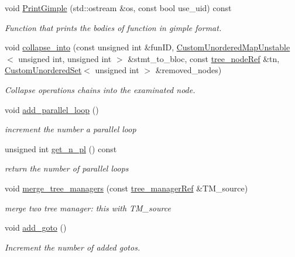 \begin{DoxyCompactItemize}
void \hyperlink{classtree__manager_a580b0289adae5c5d180ceae72ea854fc}{Print\+Gimple} (std\+::ostream \&os, const bool use\+\_\+uid) const
\begin{DoxyCompactList}\small\item\em Function that prints the bodies of function in gimple format. \end{DoxyCompactList}\item 
void \hyperlink{classtree__manager_ac728a1e9ad1c48fe09936df555cb9980}{collapse\+\_\+into} (const unsigned int \&fun\+ID, \hyperlink{custom__map_8hpp_a8cbaceffc09790a885ec7e9c17809c69}{Custom\+Unordered\+Map\+Unstable}$<$ unsigned int, unsigned int $>$ \&stmt\+\_\+to\+\_\+bloc, const \hyperlink{tree__node_8hpp_a6ee377554d1c4871ad66a337eaa67fd5}{tree\+\_\+node\+Ref} \&tn, \hyperlink{classCustomUnorderedSet}{Custom\+Unordered\+Set}$<$ unsigned int $>$ \&removed\+\_\+nodes)
\begin{DoxyCompactList}\small\item\em Collapse operations chains into the examinated node. \end{DoxyCompactList}\item 
void \hyperlink{classtree__manager_ae5fe09a770ad90c17bf56cf9b3348218}{add\+\_\+parallel\+\_\+loop} ()
\begin{DoxyCompactList}\small\item\em increment the number a parallel loop \end{DoxyCompactList}\item 
unsigned int \hyperlink{classtree__manager_aa5dda04faad12c65b907fe30f2e24213}{get\+\_\+n\+\_\+pl} () const
\begin{DoxyCompactList}\small\item\em return the number of parallel loops \end{DoxyCompactList}\item 
void \hyperlink{classtree__manager_aed8f92a1b3af6492bcf87a1ff63a93e1}{merge\+\_\+tree\+\_\+managers} (const \hyperlink{tree__manager_8hpp_a96ff150c071ce11a9a7a1e40590f205e}{tree\+\_\+manager\+Ref} \&T\+M\+\_\+source)
\begin{DoxyCompactList}\small\item\em merge two tree manager\+: this with T\+M\+\_\+source \end{DoxyCompactList}\item 
void \hyperlink{classtree__manager_a0b6acab4968084ef50249e1fd6f6390d}{add\+\_\+goto} ()
\begin{DoxyCompactList}\small\item\em Increment the number of added gotos. \end{DoxyCompactList}\item 

\end{DoxyCompactItemize}

